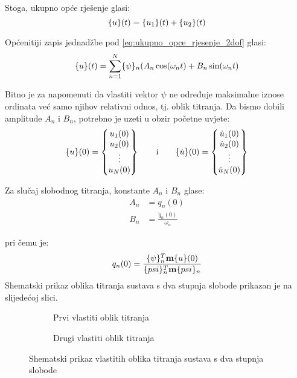 Stoga, ukupno opće rješenje glasi:
\begin{equation}\label{eq:ukupno_opce_rjesenje_2dof}
    \vtor{u}{}(t)=\vtor{u_1}{}(t)+\vtor{u_2}{}(t) 
\end{equation}

Općenitiji zapis jednadžbe pod \eqref{eq:ukupno_opce_rjesenje_2dof} glasi:
\begin{equation}\label{eq:ukupno_opce_rjesenje_mdof}
    \vtor{u}{}(t)=\sum_{n=1}^N \vtor{\psi}{}_n (A_n\cos(\omega_nt) + B_n\sin(\omega_nt)
\end{equation}

\newpage
Bitno je za napomenuti da vlastiti vektor $\psi$ ne određuje maksimalne iznose
ordinata već samo njihov relativni odnos, tj. oblik titranja. Da
bismo dobili amplitude $A_n$ i $B_n$, potrebno je uzeti u obzir početne uvjete:
\begin{equation}
    \vtor{u}{}(0)  = \begin{Bmatrix} u_1(0)\\ u_2(0)\\ \vdots\\ u_N(0) \end{Bmatrix}
    \qquad \text{i} \qquad
    \vtor{u}{.}(0) = \begin{Bmatrix} \dot{u}_1(0)\\ \dot{u}_2(0)\\ \vdots\\ \dot{u}_N(0) \end{Bmatrix}
\end{equation}

Za slučaj slobodnog titranja, konstante $A_n$ i $B_n$ glase:
\begin{align}
    A_n&=q_n(0)\\
    B_n&=\frac{\dot{q}_n(0)}{\omega_n}
\end{align}

pri čemu je:
\begin{align}
    q_n(0) = \frac{\vtor{\psi}{}_n^T \mm \vtor{u}{}(0)}{\vtor{psi}{}_n^T \mm \vtor{psi}{}_n}
\end{align}
Shematski prikaz oblika titranja sustava s dva stupnja slobode prikazan je na slijedećoj
slici.
\begin{figure}[H]
    \centering
    \begin{subfigure}[b]{0.4\textwidth}
        \centering
        
        \caption{Prvi vlastiti oblik titranja}
    \end{subfigure}
    \begin{subfigure}[b]{0.4\textwidth}
        \centering
        
        \caption{Drugi vlastiti oblik titranja}
    \end{subfigure}
    \caption{Shematski prikaz vlastitih oblika titranja sustava s dva stupnja slobode}
\end{figure}
